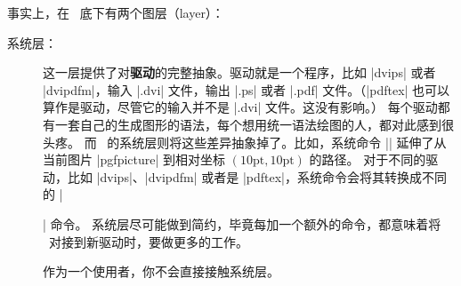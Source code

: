 \begin{onehalfspacing}

事实上，在 \tikzname\ 底下有两个图层（layer）：

\begin{description}
\item[系统层：] 这一层提供了对\textbf{驱动}的完整抽象。驱动就是一个程序，比如 |dvips| 或者 |dvipdfm|，输入 |.dvi| 文件，输出 |.ps| 或者 |.pdf| 文件。（|pdftex| 也可以算作是驱动，尽管它的输入并不是 |.dvi| 文件。这没有影响。）
每个驱动都有一套自己的生成图形的语法，每个想用统一语法绘图的人，都对此感到很头疼。
而 \pgfname\ 的系统层则将这些差异抽象掉了。比如，系统命令 |\pgfsys@lineto{10pt}{10pt}| 延伸了从当前图片 |{pgfpicture}| 到相对坐标 $(10\mathrm{pt},10\mathrm{pt})$ 的路径。
对于不同的驱动，比如 |dvips|、|dvipdfm| 或者是 |pdftex|，系统命令会将其转换成不同的 |\special| 命令。
系统层尽可能做到简约，毕竟每加一个额外的命令，都意味着将 \pgfname\ 对接到新驱动时，要做更多的工作。

作为一个使用者，你不会直接接触系统层。


\end{description}
\end{onehalfspacing}

